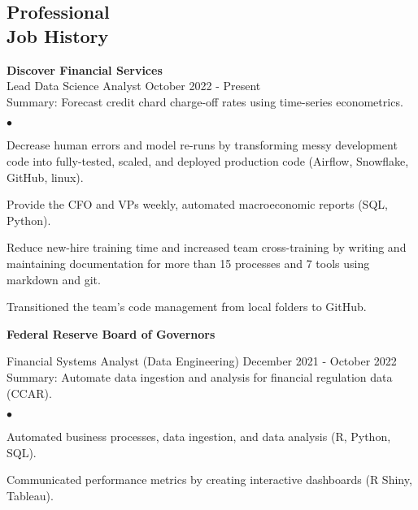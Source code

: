 \documentclass[margin, line]{res}
\newenvironment{list2}{
  \begin{list}{$\bullet$}{%
      \setlength{\itemsep}{0.04in}
      \setlength{\parsep}{0in} \setlength{\parskip}{0in}
      \setlength{\topsep}{0.05in} \setlength{\partopsep}{0in} 
      \setlength{\leftmargin}{\dimexpr 26pt-0.05in}}}
    {\end{list}}
\begin{document}
\begin{resume}
\vspace{-.35cm}


\section{\sc Professional \\ Job History }

{\bf Discover Financial Services}\\

\vspace{-.65cm}
Lead Data Science Analyst \hfill October 2022 - Present\\
\hspace*{3mm} 
    Summary: Forecast credit chard charge-off rates using time-series econometrics.
\hspace*{3mm}
    \begin{list2}
        \item Decrease human errors and model re-runs by transforming messy development code into fully-tested, scaled, and deployed production code (Airflow, Snowflake, GitHub, linux).
        \item Provide the CFO and VPs weekly, automated macroeconomic reports (SQL, Python).
        \item Reduce new-hire training time and increased team cross-training by writing and maintaining documentation for more than 15 processes and 7 tools using markdown and git.
        \item Transitioned the team's code management from local folders to GitHub.
    \end{list2}

{\bf Federal Reserve Board of Governors}\\

\vspace{-.65cm}

Financial Systems Analyst (Data Engineering) \hfill December 2021 - October 2022\\
\hspace*{3mm} 
    Summary: Automate data ingestion and analysis for financial regulation data (CCAR).
\hspace*{3mm}
    \begin{list2}
        \item Automated business processes, data ingestion, and data analysis (R, Python, SQL).
        \item Communicated performance metrics by creating interactive dashboards (R Shiny, Tableau).
    \end{list2}



\end{resume}
\end{document}
